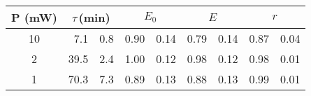 \begin{tabular}{cr@{$\,\pm\,$}lr@{$\,\pm\,$}lr@{$\,\pm\,$}lr@{$\,\pm\,$}l}
\toprule
P (mW)
   & \multicolumn{2}{c}{$\tau$\,(min)}
                 & \multicolumn{2}{c}{$E_0$}
                                & \multicolumn{2}{c}{$E$}
                                               & \multicolumn{2}{c}{$r$} \\
\midrule

10 &   7.1 & 0.8 &  0.90 & 0.14 &  0.79 & 0.14 &  0.87 & 0.04 \\
 2 &  39.5 & 2.4 &  1.00 & 0.12 &  0.98 & 0.12 &  0.98 & 0.01 \\
 1 &  70.3 & 7.3 &  0.89 & 0.13 &  0.88 & 0.13 &  0.99 & 0.01 \\
\bottomrule
\end{tabular}
